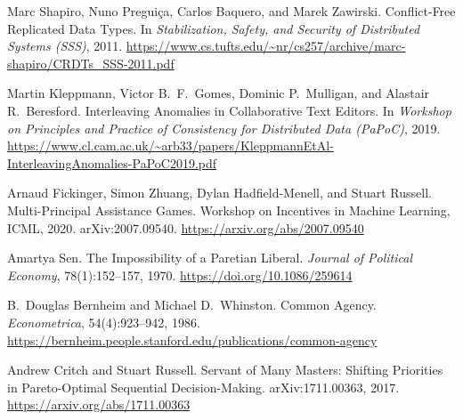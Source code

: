 Marc Shapiro, Nuno Pregui\c{c}a, Carlos Baquero, and Marek Zawirski.
\newblock Conflict-Free Replicated Data Types.
\newblock In \textit{Stabilization, Safety, and Security of Distributed Systems (SSS)}, 2011.
\newblock \url{https://www.cs.tufts.edu/~nr/cs257/archive/marc-shapiro/CRDTs_SSS-2011.pdf}

Martin Kleppmann, Victor B.\ F.\ Gomes, Dominic P.\ Mulligan, and Alastair R.\ Beresford.
\newblock Interleaving Anomalies in Collaborative Text Editors.
\newblock In \textit{Workshop on Principles and Practice of Consistency for Distributed Data (PaPoC)}, 2019.
\newblock \url{https://www.cl.cam.ac.uk/~arb33/papers/KleppmannEtAl-InterleavingAnomalies-PaPoC2019.pdf}

Arnaud Fickinger, Simon Zhuang, Dylan Hadfield-Menell, and Stuart Russell.
\newblock Multi-Principal Assistance Games.
\newblock Workshop on Incentives in Machine Learning, ICML, 2020. arXiv:2007.09540. \url{https://arxiv.org/abs/2007.09540}

Amartya Sen.
\newblock The Impossibility of a Paretian Liberal.
\newblock \textit{Journal of Political Economy}, 78(1):152--157, 1970.
\newblock \url{https://doi.org/10.1086/259614}

B.\ Douglas Bernheim and Michael D.\ Whinston.
\newblock Common Agency.
\newblock \textit{Econometrica}, 54(4):923--942, 1986.
\newblock \url{https://bernheim.people.stanford.edu/publications/common-agency}

Andrew Critch and Stuart Russell.
\newblock Servant of Many Masters: Shifting Priorities in Pareto-Optimal Sequential Decision-Making.
\newblock arXiv:1711.00363, 2017. \url{https://arxiv.org/abs/1711.00363}
